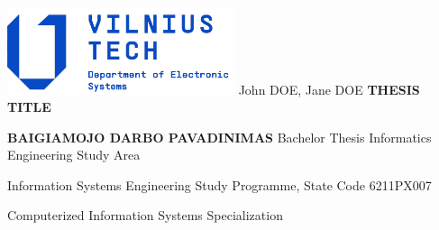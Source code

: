 \begin{titlepage}
    \includegraphics[width=0.5\textwidth]{vtechlogo.png}
    \vskip 7cm
    \noindent\large John DOE, Jane DOE
    \vskip 1cm
    \noindent\large \MakeUppercase{\textbf{Thesis title}}

    \noindent\large \MakeUppercase{\textbf{Baigiamojo darbo pavadinimas}}
    \vskip 1cm
    \noindent\large Bachelor Thesis
    \vskip 1cm
    \noindent Informatics Engineering Study Area

    \noindent Information Systems Engineering Study Programme, State Code 6211PX007

    \noindent Computerized Information Systems Specialization
\end{titlepage}
\pagebreak
